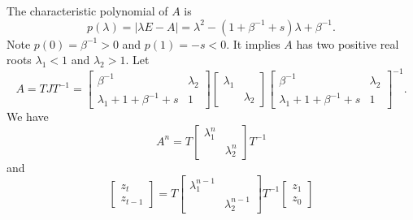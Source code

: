 \documentclass{article}
\begin{document}
The characteristic polynomial of $A$ is
\[
p(\lambda)=|\lambda E-A|=\lambda^2-(1+\beta^{-1}+s)\lambda+\beta^{-1}.
\]
Note $p(0)=\beta^{-1}>0$ and $p(1)=-s<0$. It implies $A$ has two positive real roots $\lambda_1< 1$ and $\lambda_2>1$. Let 
$$
A=TJT^{-1}=
\begin{bmatrix}
\beta^{-1}&\lambda_2\\
\lambda_1+1+\beta^{-1}+s&1  
\end{bmatrix}
\begin{bmatrix}
\lambda_1&\\
 &\lambda_2
\end{bmatrix}
\begin{bmatrix}
\beta^{-1}&\lambda_2\\
\lambda_1+1+\beta^{-1}+s&1  
\end{bmatrix}^{-1}
.
$$
We have 
\[
A^n=T
\begin{bmatrix}
\lambda_1^n&\\
&\lambda_2^n
\end{bmatrix}
T^{-1}
\]
and
\[
\begin{bmatrix}
z_{t}\\
z_{t-1}  
\end{bmatrix}
=T
\begin{bmatrix}
\lambda_1^{n-1}&\\
&\lambda_2^{n-1}
\end{bmatrix}
T^{-1}
\begin{bmatrix}
z_{1}\\
z_{0}  
\end{bmatrix}
\]

%
%
\end{document}
